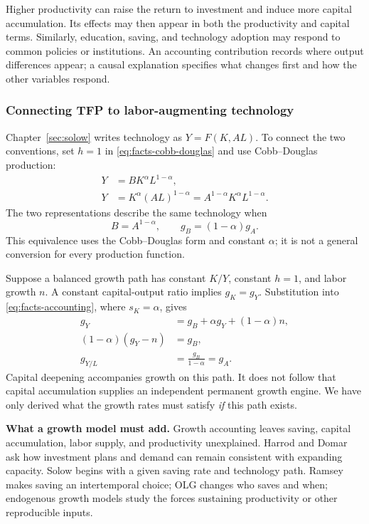 Higher productivity can raise the return to investment and induce more capital
accumulation. Its effects may then appear in both the productivity and capital
terms. Similarly, education, saving, and technology adoption may respond to
common policies or institutions. An accounting contribution records where
output differences appear; a causal explanation specifies what changes first
and how the other variables respond.

\subsubsection{Connecting TFP to labor-augmenting technology}

Chapter~\ref{sec:solow} writes technology as $Y=F(K,AL)$. To connect the two conventions,
set $h=1$ in \eqref{eq:facts-cobb-douglas} and use Cobb--Douglas production:
\begin{align}
Y&=BK^\alpha L^{1-\alpha},\\
Y&=K^\alpha(AL)^{1-\alpha}
  =A^{1-\alpha}K^\alpha L^{1-\alpha}.
\end{align}
The two representations describe the same technology when
\begin{equation}\label{eq:facts-technology-convention}
B=A^{1-\alpha},\qquad g_B=(1-\alpha)g_A.
\end{equation}
This equivalence uses the Cobb--Douglas form and constant $\alpha$; it is not a
general conversion for every production function.

Suppose a balanced growth path has constant $K/Y$, constant $h=1$, and labor
growth $n$. A constant capital-output ratio implies $g_K=g_Y$. Substitution into
\eqref{eq:facts-accounting}, where $s_K=\alpha$, gives
\begin{align}
g_Y&=g_B+\alpha g_Y+(1-\alpha)n,\\
(1-\alpha)(g_Y-n)&=g_B,\\
g_{Y/L}&=\frac{g_B}{1-\alpha}=g_A.
\end{align}
Capital deepening accompanies growth on this path. It does not follow that
capital accumulation supplies an independent permanent growth engine. We have
only derived what the growth rates must satisfy \emph{if} this path exists.

\begin{greenblock}
\textbf{What a growth model must add.}
Growth accounting leaves saving, capital accumulation, labor supply, and
productivity unexplained. Harrod and Domar ask how investment plans and demand
can remain consistent with expanding capacity. Solow begins with a given
saving rate and technology path. Ramsey makes saving an intertemporal choice; OLG changes who saves and
when; endogenous growth models study the forces sustaining productivity or
other reproducible inputs.
\end{greenblock}

